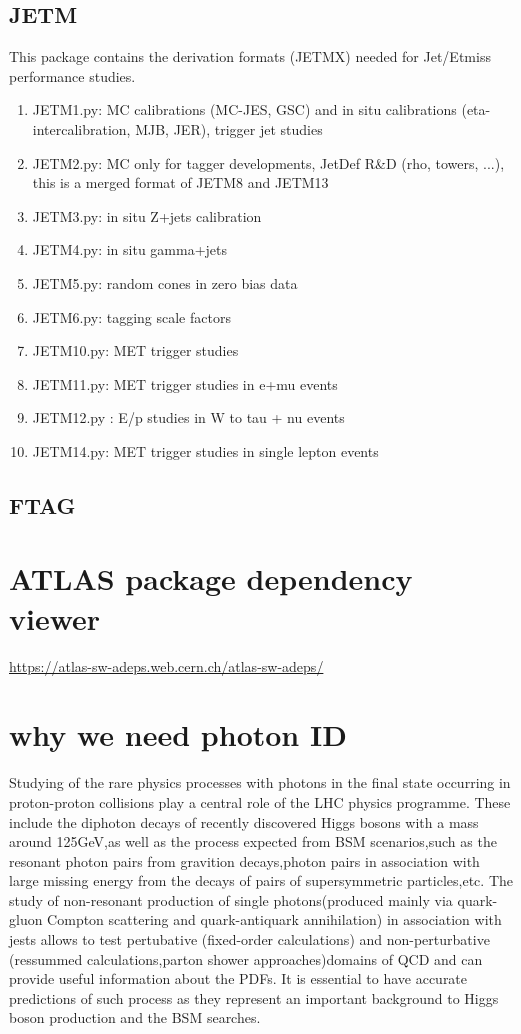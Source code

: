 \documentclass{ctexart}
\begin{document}
\subsection{JETM}
This package contains the derivation formats (JETMX) needed for Jet/Etmiss performance studies.
\begin{enumerate}
    \item JETM1.py:  MC calibrations (MC-JES, GSC) and in situ calibrations (eta-intercalibration, MJB, JER), trigger jet studies
    \item JETM2.py: MC only for tagger developments, JetDef R\&D (rho, towers, ...), this is a merged format of JETM8 and JETM13
    \item JETM3.py: in situ Z+jets calibration
    \item JETM4.py: in situ gamma+jets
    \item JETM5.py: random cones in zero bias data
    \item JETM6.py: tagging scale factors
    \item JETM10.py: MET trigger studies
    \item JETM11.py: MET trigger studies in e+mu events
    \item JETM12.py : E/p studies in W to tau + nu events
    \item JETM14.py: MET trigger studies in single lepton events
\end{enumerate}
\subsection{FTAG}
\section{ATLAS package dependency viewer }
\url{https://atlas-sw-adeps.web.cern.ch/atlas-sw-adeps/}
\section{why we need photon ID}
Studying of the rare physics processes with photons in the final state occurring in proton-proton collisions play a central role of the LHC physics programme. These include the diphoton decays of recently discovered Higgs bosons with a mass around 125GeV,as well as the process expected from BSM scenarios,such as the resonant photon pairs from gravition decays,photon pairs in association with large missing energy from the decays of pairs of supersymmetric particles,etc. The study of non-resonant production of single photons(produced mainly via quark-gluon Compton scattering and quark-antiquark annihilation) in association with jests allows to test pertubative (fixed-order calculations) and non-perturbative (ressummed calculations,parton shower approaches)domains of QCD and can provide useful information about the PDFs. It is essential to have accurate predictions of such process as they represent an important background to Higgs boson production and the BSM searches.
\end{document}
